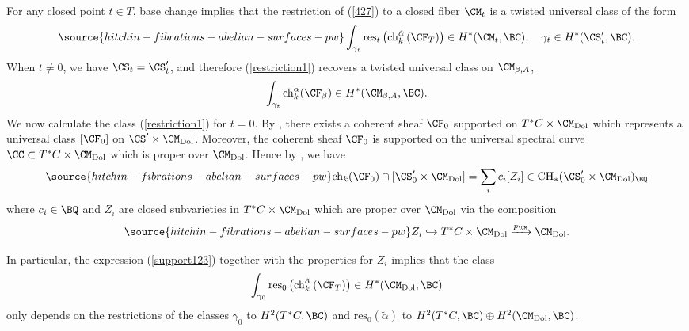 For any closed point $t \in T$, base change \cite[Proposition 1.7]{Fulton} implies that the restriction of (\ref{427}) to a closed fiber $\CM_t$ is a twisted universal class of the form
\begin{equation}\label{restriction1}
\source{hitchin-fibrations-abelian-surfaces-pw}
\int_{\gamma_t} \mathrm{res}_t\left( \mathrm{ch}_k^{\tilde{\alpha}} \left(\CF_T\right)\right) \in H^*(\CM_t, \BC),\quad \gamma_t \in H^*(\CS'_t, \BC).
\end{equation}
When $t \neq 0$, we have $\CS_t= \CS'_t$, and therefore (\ref{restriction1}) recovers a twisted universal class on $\CM_{\beta,A}$,
\[
\int_{\gamma_t} \mathrm{ch}_k^\alpha (\CF_\beta) \in H^*(\CM_{\beta,A}, \BC).
\]
We now calculate the class (\ref{restriction1}) for $t =0$. By \cite[Theorem 4.6.5]{HL}, there exists a coherent sheaf $\CF_0$ supported on $T^*C \times \CM_{\mathrm{Dol}}$ which represents a universal class $[\CF_0]$ on $\CS'\times \CM_{\mathrm{Dol}}$. Moreover, the coherent sheaf $\CF_0$ is supported on the universal spectral curve $\CC \subset T^*C \times \CM_{\mathrm{Dol}}$ which is proper over $\CM_{\mathrm{Dol}}$. Hence by \cite[Property 2.1]{BFM}, we have
\begin{equation}\label{support123}
\source{hitchin-fibrations-abelian-surfaces-pw}
\mathrm{ch}_k(\CF_0) \cap [\CS_0'\times \CM_{\mathrm{Dol}}] = \sum_i c_i [Z_i] \in \mathrm{CH}_*(\CS'_0 \times \CM_{\mathrm{Dol}})_\BQ
\end{equation}
where $c_i \in \BQ$ and $Z_i$ are closed subvarieties in $T^*C \times \CM_{\mathrm{Dol}}$ which are proper over $\CM_{\mathrm{Dol}}$ via the composition
 \begin{equation}\label{composition1}
\source{hitchin-fibrations-abelian-surfaces-pw}
 Z_i \hookrightarrow T^*C \times \CM_{\mathrm{Dol}} \xrightarrow{p_\CM} \CM_{\mathrm{Dol}}.
 \end{equation}



In particular, the expression (\ref{support123}) together with the properties for $Z_i$ implies that the class
\[
\int_{\gamma_0} \mathrm{res}_0\left( \mathrm{ch}_k^{\tilde{\alpha}} \left(\CF_T\right)\right) \in H^*(\CM_{\mathrm{Dol}}, \BC)
\]
only depends on the restrictions of the classes {$\gamma_0$  to $H^2(T^*C, \BC)$ and
 $\mathrm{res}_0(\tilde{\alpha})$ to  $H^2(T^*C, \BC)\oplus H^2(\CM_{\mathrm{Dol}}, \BC)$}.


